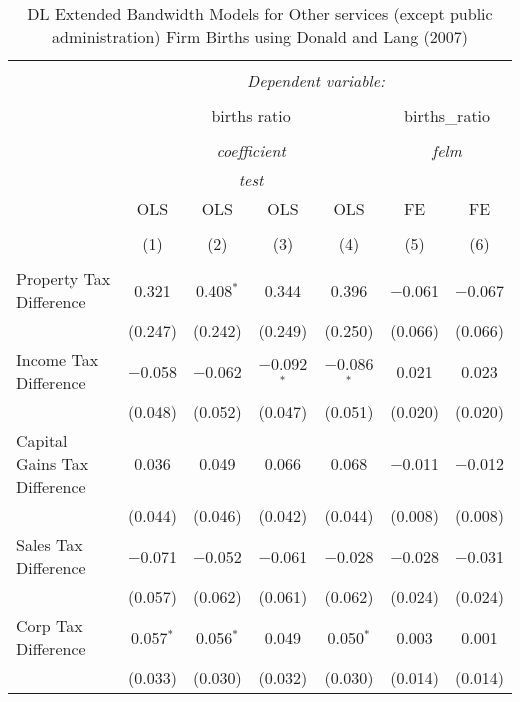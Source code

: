 
\begin{table}[!htbp] \centering 
  \caption{DL Extended Bandwidth Models for  Other services (except public administration) Firm Births using Donald and Lang (2007)} 
  \label{} 
\begin{tabular}{@{\extracolsep{5pt}}lcccccc} 
\\[-1.8ex]\hline 
\hline \\[-1.8ex] 
 & \multicolumn{6}{c}{\textit{Dependent variable:}} \\ 
\cline{2-7} 
\\[-1.8ex] & \multicolumn{4}{c}{births ratio} & \multicolumn{2}{c}{births\_ratio} \\ 
\\[-1.8ex] & \multicolumn{4}{c}{\textit{coefficient}} & \multicolumn{2}{c}{\textit{felm}} \\ 
 & \multicolumn{4}{c}{\textit{test}} & \multicolumn{2}{c}{\textit{}} \\ 
 & OLS & OLS & OLS & OLS & FE & FE \\ 
\\[-1.8ex] & (1) & (2) & (3) & (4) & (5) & (6)\\ 
\hline \\[-1.8ex] 
 Property Tax Difference & 0.321 & 0.408$^{*}$ & 0.344 & 0.396 & $-$0.061 & $-$0.067 \\ 
  & (0.247) & (0.242) & (0.249) & (0.250) & (0.066) & (0.066) \\ 
  Income Tax Difference & $-$0.058 & $-$0.062 & $-$0.092$^{*}$ & $-$0.086$^{*}$ & 0.021 & 0.023 \\ 
  & (0.048) & (0.052) & (0.047) & (0.051) & (0.020) & (0.020) \\ 
  Capital Gains Tax Difference & 0.036 & 0.049 & 0.066 & 0.068 & $-$0.011 & $-$0.012 \\ 
  & (0.044) & (0.046) & (0.042) & (0.044) & (0.008) & (0.008) \\ 
  Sales Tax Difference & $-$0.071 & $-$0.052 & $-$0.061 & $-$0.028 & $-$0.028 & $-$0.031 \\ 
  & (0.057) & (0.062) & (0.061) & (0.062) & (0.024) & (0.024) \\ 
  Corp Tax Difference & 0.057$^{*}$ & 0.056$^{*}$ & 0.049 & 0.050$^{*}$ & 0.003 & 0.001 \\ 
  & (0.033) & (0.030) & (0.032) & (0.030) & (0.014) & (0.014) \\ 

\end{tabular}
\end{table}

